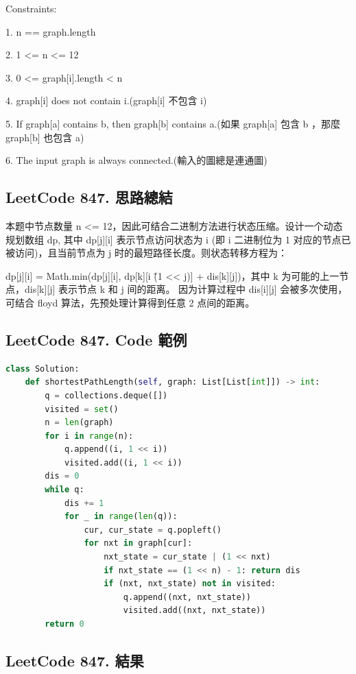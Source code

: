 \documentclass[10pt,UTF8]{ctexart}
\begin{document}
Constraints:

1. n == graph.length

2. 1 <= n <= 12

3. 0 <= graph[i].length < n

4. graph[i] does not contain i.(graph[i] 不包含 i)

5. If graph[a] contains b, then graph[b] contains a.(如果 graph[a] 包含 b ，那麼 graph[b] 也包含 a)

6. The input graph is always connected.(輸入的圖總是連通圖)

\subsection{LeetCode 847. 思路總結}

本题中节点数量 n <= 12，因此可结合二进制方法进行状态压缩。设计一个动态规划数组 dp, 其中 dp[j][i] 表示节点访问状态为 i (即 i 二进制位为 1 对应的节点已被访问)，且当前节点为 j 时的最短路径长度。则状态转移方程为：

dp[j][i] = Math.min(dp[j][i], dp[k][i \^ (1 << j)] + dis[k][j])，其中 k 为可能的上一节点，dis[k][j] 表示节点 k 和 j 间的距离。
因为计算过程中 dis[i][j] 会被多次使用，可结合 floyd 算法，先预处理计算得到任意 2 点间的距离。

\subsection{LeetCode 847. Code 範例}

\begin{lstlisting}[language={python}]
class Solution:
    def shortestPathLength(self, graph: List[List[int]]) -> int:
        q = collections.deque([])
        visited = set()
        n = len(graph)
        for i in range(n):
            q.append((i, 1 << i))
            visited.add((i, 1 << i))
        dis = 0
        while q:
            dis += 1
            for _ in range(len(q)):
                cur, cur_state = q.popleft()
                for nxt in graph[cur]:
                    nxt_state = cur_state | (1 << nxt)
                    if nxt_state == (1 << n) - 1: return dis
                    if (nxt, nxt_state) not in visited:
                        q.append((nxt, nxt_state))
                        visited.add((nxt, nxt_state))
        return 0
\end{lstlisting}

\subsection{LeetCode 847. 結果}
\end{document}
